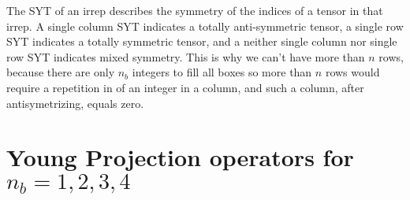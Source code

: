 The SYT of  an irrep describes
the symmetry of the indices
of a tensor in that irrep.
A single column SYT indicates a
totally
anti-symmetric tensor, a
single row SYT indicates a totally symmetric tensor,
and a neither single column nor single
row SYT indicates mixed symmetry. This
is why we can't have more than $n$ rows,
because there are only $n_b$ integers
to fill all boxes so more
than $n$ rows would require a  repetition
in of an integer in a column, and
such a column, after antisymetrizing, equals zero.


\section{Young Projection operators for $n_b=1,2,3,4$}

\newcommand{\YTone}[0]{
$
\bcen
\text{
\begin{ytableau}
1
\end{ytableau}}
\\
\xymatrix{
&\ar[l]
}
\ecen
$
}

\newcommand{\YTs}[0]{
$
\bcen
\text{
\begin{ytableau}
1 & 2
\end{ytableau}
}
\\
\xymatrix@R=1pc@C=1pc{
&\ar[l]\ar@2{-}[d]\cals_2&\ar[l]
\\
&\ar[l]&\ar[l]
}\ecen
$
}
\newcommand{\YTss}[0]{
$
\bcen
\text{
\begin{ytableau}
1 & 2 &3
\end{ytableau}
}
\\
\xymatrix@R=1pc@C=1pc{
&\ar[l]\ar@2{-}[dd]\cals_2&\ar[l]
\\
&\ar[l]&\ar[l]
\\
&\ar[l]&\ar[l]
}\ecen
$
}

\newcommand{\YTsss}[0]{
$
\bcen
\text{
\begin{ytableau}
1 & 2 &3 &4
\end{ytableau}
}
\\
\xymatrix@R=1pc@C=1pc{
&\ar[l]\ar@2{-}[ddd]\cals_2&\ar[l]
\\
&\ar[l]&\ar[l]
\\
&\ar[l]&\ar[l]
\\
&\ar[l]&\ar[l]
}\ecen
$
}


\newcommand{\YTa}[0]{
$\bcen
\begin{ytableau}
1 \\2
\end{ytableau}
\\
\xymatrix@R=1pc@C=1pc{
&\ar[l]\ar@2{-}[d]\cala_2&\ar[l]
\\
&\ar[l]&\ar[l]
}
\ecen $
}
\newcommand{\YTaa}[0]{
$\bcen
\begin{ytableau}
1 \\2\\3
\end{ytableau}
\\
\xymatrix@R=1pc@C=1pc{
&\ar[l]\ar@2{-}[dd]\cala_2&\ar[l]
\\
&\ar[l]&\ar[l]
\\
&\ar[l]&\ar[l]
}
\ecen $
}

